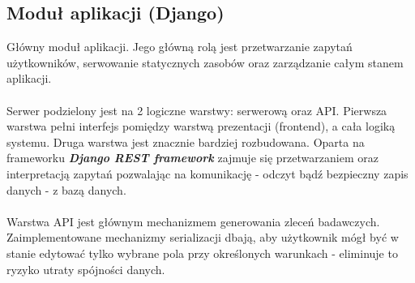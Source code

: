 \documentclass[a4paper,onecolumn,oneside,12pt]{memoir}
\begin{document}
{\subsection{Moduł aplikacji (Django)}
\quad \quad Główny moduł aplikacji. Jego główną rolą jest przetwarzanie zapytań użytkowników,
serwowanie statycznych zasobów oraz zarządzanie całym stanem aplikacji. \\
\\
Serwer podzielony jest na 2 logiczne warstwy: serwerową oraz API. Pierwsza warstwa
pełni interfejs pomiędzy warstwą prezentacji (frontend), a cała logiką systemu.
Druga warstwa jest znacznie bardziej rozbudowana. Oparta na frameworku \textbf{\textit{Django REST
framework}} zajmuje się przetwarzaniem oraz interpretacją zapytań pozwalając na
komunikację - odczyt bądź bezpieczny zapis danych - z bazą danych.\\
\\
Warstwa API jest głównym mechanizmem generowania zleceń badawczych. Zaimplementowane
mechanizmy serializacji dbają, aby użytkownik mógł być w stanie edytować tylko
wybrane pola przy określonych warunkach - eliminuje to ryzyko utraty spójności
danych.\\

}
\end{document}
